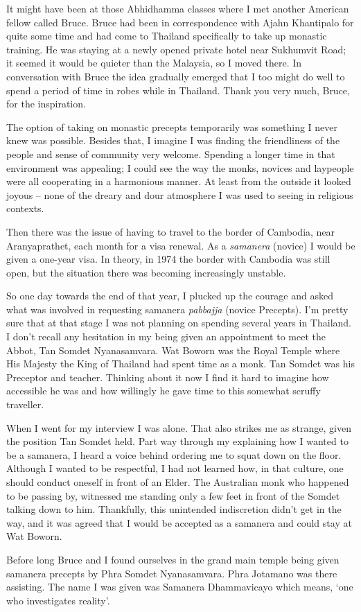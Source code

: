 It might have been at those Abhidhamma classes where I met another
American fellow called Bruce. Bruce had been in correspondence with
Ajahn Khantipalo for quite some time and had come to Thailand
specifically to take up monastic training. He was staying at a newly
opened private hotel near Sukhumvit Road; it seemed it would be quieter
than the Malaysia, so I moved there. In conversation with Bruce the idea
gradually emerged that I too might do well to spend a period of time in
robes while in Thailand. Thank you very much, Bruce, for the
inspiration.

The option of taking on monastic precepts temporarily was something I
never knew was possible. Besides that, I imagine I was finding the
friendliness of the people and sense of community very welcome. Spending
a longer time in that environment was appealing; I could see the way the
monks, novices and laypeople were all cooperating in a harmonious
manner. At least from the outside it looked joyous -- none of the dreary
and dour atmosphere I was used to seeing in religious contexts.

Then there was the issue of having to travel to the border of Cambodia,
near Aranyaprathet, each month for a visa renewal. As a \emph{samanera}
(novice) I would be given a one-year visa. In theory, in 1974 the border
with Cambodia\cite{cambodia} was still open, but the situation there was becoming
increasingly unstable.

So one day towards the end of that year, I plucked up the courage and
asked what was involved in requesting samanera \emph{pabbajja} (novice
Precepts). I'm pretty sure that at that stage I was not planning on
spending several years in Thailand. I don't recall any hesitation in my
being given an appointment to meet the Abbot, Tan Somdet Nyanasamvara.
Wat Boworn was the Royal Temple where His Majesty the King of Thailand
had spent time as a monk. Tan Somdet was his Preceptor and teacher.
Thinking about it now I find it hard to imagine how accessible he was
and how willingly he gave time to this somewhat scruffy traveller.

When I went for my interview I was alone. That also strikes me as
strange, given the position Tan Somdet held. Part way through my
explaining how I wanted to be a samanera, I heard a voice behind
ordering me to squat down on the floor. Although I wanted to be
respectful, I had not learned how, in that culture, one should conduct
oneself in front of an Elder. The Australian monk who happened to be
passing by, witnessed me standing only a few feet in front of the Somdet
talking down to him. Thankfully, this unintended indiscretion didn't get
in the way, and it was agreed that I would be accepted as a samanera and
could stay at Wat Boworn.

Before long Bruce and I found ourselves in the grand main temple being given
samanera precepts by Phra Somdet Nyanasamvara. Phra Jotamano was there
assisting. The name I was given was Samanera Dhammavicayo which means,
`one who investigates reality'.


